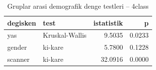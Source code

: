 \begin{table}[htbp]
  \centering
  \caption{Gruplar arasi demografik denge testleri -- 4class}
  \label{tab:balance_4class}
  \small
  \begin{tabular}{llrr}
    \toprule
    degisken & test & istatistik & p \\
    \midrule
    yas & Kruskal-Wallis & 9.5035 & 0.0233 \\
    gender & ki-kare & 5.7800 & 0.1228 \\
    scanner & ki-kare & 32.0916 & 0.0000 \\
    \bottomrule
  \end{tabular}
\end{table}
